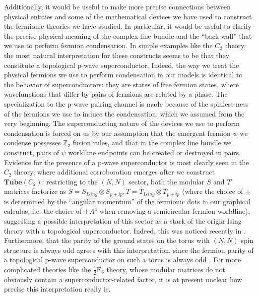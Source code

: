 \documentclass[12pt,a4paper]{article}
\newcommand{\tp}{\otimes}
\newcommand{\zt}{\mathbb{Z}_2}
\newcommand{\tube}{\textbf{Tube}}
\newcommand{\halfesix}{\frac{1}{2}\text{E}_6}
\begin{document}
Additionally, it would be useful to make more precise connections between physical entities and some of the mathematical 
devices we have used to construct the fermionic theories 
we have studied. 
In particular, it would be useful to clarify the precise physical meaning of the complex line bundle 
and the ``back wall'' that we use to perform fermion condensation. 
In simple examples like the $C_2$ theory, the most natural interpretation for these constructs 
seems to be that they constitute a topological p-wave superconductor.
Indeed, the way we treat the physical fermions we use to perform condensation 
in our models is identical to the behavior of 
superconductors: they are states of 
free fermion states, where wavefunctions that differ by pairs of 
fermions are related by a phase. 
The specialization to the p-wave pairing channel is made because of the spinless-ness
of the fermions we use to induce the condensation, which we assumed from the very 
beginning.  
The superconducting nature of the devices we use to perform condensation is forced on us
by our assumption that the emergent fermion $\psi$ we condense possesses $\zt$
fusion rules, and that in the complex line bundle we construct, pairs of
$\psi$ worldline endpoints can be created or destroyed in pairs. 
Evidence for the presence of a p-wave superconductor is most clearly seen in the $C_2$ theory, 
where additional corroboration emerges after we construct $\tube(C_2)$: 
restricting to the $(N,N)$ sector, both the modular $S$ and $T$ matrices 
factorize as $S=S_{Ising}\tp S_{p\pm ip}, T = T_{Ising} \tp T_{p\pm ip}$ (where the 
choice of $\pm$ is determined by the ``angular momentum'' of the fermionic dots 
in our graphical calculus, i.e. the choice of $\pm A^4$ when removing a semicircular fermion
worldline), suggesting a possible interpretation of this sector 
as a stack of the origin Ising theory with a topological superconductor. 
Indeed, this was noticed recently in \cite{ware2016}.
Furthermore, that the parity of the ground states on the torus with $(N,N)$ spin structure is always 
odd agrees with this interpretation, since the fermion parity of a topological 
p-wave superconductor on such a torus is always odd \cite{you2015}.
For more
complicated theories like the $\halfesix$ theory, whose modular matrices do not obviously contain a superconductor-related factor, 
it is at present unclear how precise this interpretation really is. 
\end{document}
